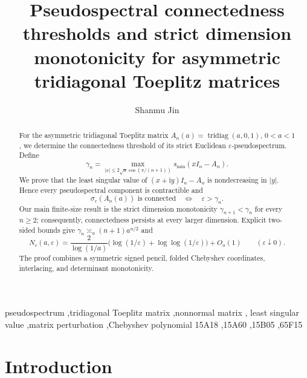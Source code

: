 \documentclass[a4paper,preprint,12pt,nopreprintline,sort&compress]{elsarticle}
\numberwithin{equation}{section}
\theoremstyle{remark}
\DeclareMathOperator{\tridiag}{tridiag}
\newcommand{\ii}{\mathrm i}
\begin{document}
\begin{frontmatter}

\title{Pseudospectral connectedness thresholds and strict dimension
monotonicity for asymmetric tridiagonal Toeplitz matrices}

\author[inst1]{Shanmu Jin}

\begin{abstract}
For the asymmetric tridiagonal Toeplitz matrix
\(A_n(a)=\tridiag(a,0,1)\), \(0<a<1\), we determine the connectedness
threshold of its strict Euclidean \(\varepsilon\)-pseudospectrum.  Define
\[
 \gamma_n=\max_{|x|\leq2\sqrt a\cos(\pi/(n+1))}
 s_{\min}(xI_n-A_n).
\]
We prove that the least singular value of
\((x+\ii y)I_n-A_n\) is nondecreasing in \(\lvert y\rvert\).  Hence every
pseudospectral component is contractible and
\[
 \sigma_\varepsilon(A_n(a))\text{ is connected}
 \quad\Longleftrightarrow\quad \varepsilon>\gamma_n.
\]
Our main finite-size result is the strict dimension monotonicity
\(\gamma_{n+1}<\gamma_n\) for every \(n\geq2\); consequently,
connectedness persists at every larger dimension.  Explicit two-sided
bounds give \(\gamma_n\asymp_a(n+1)a^{n/2}\) and
\[
 N_c(a,\varepsilon)=\frac{2}{\log(1/a)}
 \bigl(\log(1/\varepsilon)+\log\!\log(1/\varepsilon)\bigr)+O_a(1)
 \qquad(\varepsilon\downarrow0).
\]
The proof combines a symmetric signed pencil, folded Chebyshev coordinates,
interlacing, and determinant monotonicity.
\end{abstract}

\begin{keyword}
pseudospectrum \sep tridiagonal Toeplitz matrix \sep nonnormal matrix \sep
least singular value \sep matrix perturbation \sep Chebyshev polynomial
\MSC[2020] 15A18 \sep 15A60 \sep 15B05 \sep 65F15
\end{keyword}

\end{frontmatter}

\section{Introduction}\label{sec:introduction}
\end{document}
